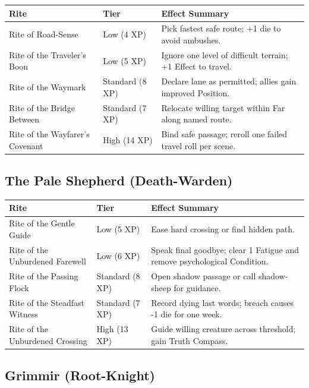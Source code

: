 \begin{longtable}{p{} p{} p{}}
\hline
\textbf{Rite} & \textbf{Tier} & \textbf{Effect Summary} \\
\hline
Rite of Road-Sense & Low (4 XP) & Pick fastest safe route; +1 die to avoid ambushes. \\
Rite of the Traveler's Boon & Low (5 XP) & Ignore one level of difficult terrain; +1 Effect to travel. \\
Rite of the Waymark & Standard (8 XP) & Declare lane as permitted; allies gain improved Position. \\
Rite of the Bridge Between & Standard (7 XP) & Relocate willing target within Far along named route. \\
Rite of the Wayfarer's Covenant & High (14 XP) & Bind safe passage; reroll one failed travel roll per scene. \\
\hline
\end{longtable}

\subsection{The Pale Shepherd (Death-Warden)}

\begin{longtable}{p{} p{} p{}}
\hline
\textbf{Rite} & \textbf{Tier} & \textbf{Effect Summary} \\
\hline
Rite of the Gentle Guide & Low (5 XP) & Ease hard crossing or find hidden path. \\
Rite of the Unburdened Farewell & Low (6 XP) & Speak final goodbye; clear 1 Fatigue and remove psychological Condition. \\
Rite of the Passing Flock & Standard (8 XP) & Open shadow passage or call shadow-sheep for guidance. \\
Rite of the Steadfast Witness & Standard (7 XP) & Record dying last words; breach causes -1 die for one week. \\
Rite of the Unburdened Crossing & High (13 XP) & Guide willing creature across threshold; gain Truth Compass. \\
\hline
\end{longtable}

\subsection{Grimmir (Root-Knight)}

